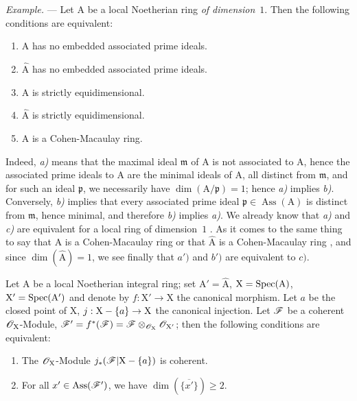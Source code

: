 \begin{env}[7.2.1.1]
\label{IV.7.2.1.1}
\emph{Example.} ---
Let $\mathrm{A}$ be a local Noetherian ring \emph{of dimension}~$1$.
Then the following conditions are equivalent:
\begin{enumerate}[label=\emph{\alph*)}]
  \item $\mathrm{A}$ has no embedded associated prime ideals.
  \item[\emph{a$'$)}] $\widehat{\mathrm{A}}$ has no embedded associated prime ideals.
  \item $\mathrm{A}$ is strictly equidimensional.
  \item[\emph{b$'$)}] $\widehat{\mathrm{A}}$ is strictly equidimensional.
  \item $\mathrm{A}$ is a Cohen-Macaulay ring.
\end{enumerate}
\end{env}


Indeed, \emph{a)} means that the maximal ideal $\mathfrak{m}$ of $\mathrm{A}$ is not associated to $\mathrm{A}$, hence the associated prime ideals to $\mathrm{A}$ are the minimal ideals of $\mathrm{A}$, all distinct from $\mathfrak{m}$, and for such an ideal $\mathfrak{p}$, we necessarily have $\dim(\mathrm{A}/\mathfrak{p})=1$; hence \emph{a)} implies \emph{b)}.
Conversely, \emph{b)} implies that every associated prime ideal $\mathfrak{p}\in\operatorname{Ass}(\mathrm{A})$ is distinct from $\mathfrak{m}$, hence minimal, and therefore \emph{b)} implies \emph{a)}.
We already know that \emph{a)} and \emph{c)} are equivalent for a local ring of dimension~$1$ .
As it comes to the same thing to say that $\mathrm{A}$ is a Cohen-Macaulay ring or that $\widehat{\mathrm{A}}$ is a Cohen-Macaulay ring , and since $\dim(\widehat{\mathrm{A}})=1$, we see finally that $a')$ and $b')$ are equivalent to $c)$.

\begin{proposition}[7.2.2]
\label{IV.7.2.2}
Let $\mathrm{A}$ be a local Noetherian integral ring; set $\mathrm{A}'=\widehat{\mathrm{A}}$, $\mathrm{X}=\operatorname{Spec}(\mathrm{A})$, $\mathrm{X}'=\operatorname{Spec}(\mathrm{A}')$ and denote by $f:\mathrm{X}'\to\mathrm{X}$ the canonical morphism.
Let $a$ be the closed point of $\mathrm{X}$, $j:\mathrm{X}-\{a\}\to\mathrm{X}$ the canonical injection.
Let $\mathscr{F}$ be a coherent $\mathscr{O}_\mathrm{X}$-Module, $\mathscr{F}'=f^*(\mathscr{F})=\mathscr{F}\otimes_{\mathscr{O}_\mathrm{X}}\mathscr{O}_{\mathrm{X}'}$; then the following conditions are equivalent:
\begin{enumerate}[label=\emph{\alph*)}]
  \item The $\mathscr{O}_\mathrm{X}$-Module $j_*(\mathscr{F}|\mathrm{X}-\{a\})$ is coherent.
  \item For all $x'\in\operatorname{Ass}(\mathscr{F}')$, we have $\dim(\overline{\{x'\}})\geqslant 2$.
\end{enumerate}
\end{proposition}


